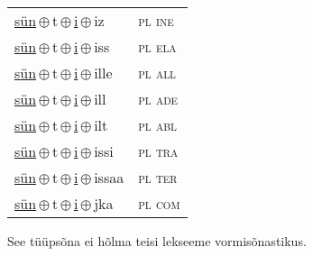 \begin{minipage}{\textwidth}
\begin{sideways}
\begin{tabular}{l l}
\underline{sün}\,$\oplus$\,t\,$\oplus$\,\underline{i}\,$\oplus$\,iz & \textsc{ pl ine } \\
\underline{sün}\,$\oplus$\,t\,$\oplus$\,\underline{i}\,$\oplus$\,iss & \textsc{ pl ela } \\
\underline{sün}\,$\oplus$\,t\,$\oplus$\,\underline{i}\,$\oplus$\,ille & \textsc{ pl all } \\
\underline{sün}\,$\oplus$\,t\,$\oplus$\,\underline{i}\,$\oplus$\,ill & \textsc{ pl ade } \\
\underline{sün}\,$\oplus$\,t\,$\oplus$\,\underline{i}\,$\oplus$\,ilt & \textsc{ pl abl } \\
\underline{sün}\,$\oplus$\,t\,$\oplus$\,\underline{i}\,$\oplus$\,issi & \textsc{ pl tra } \\
\underline{sün}\,$\oplus$\,t\,$\oplus$\,\underline{i}\,$\oplus$\,issaa & \textsc{ pl ter } \\
\underline{sün}\,$\oplus$\,t\,$\oplus$\,\underline{i}\,$\oplus$\,jka & \textsc{ pl com } \\
\end{tabular}
\end{sideways}
\label{tab:tüüpsõnamall-sünti}

\end{minipage}

 
\vspace{1em}
\noindent See tüüpsõna ei hõlma teisi lekseeme vormi\-sõnastikus.
